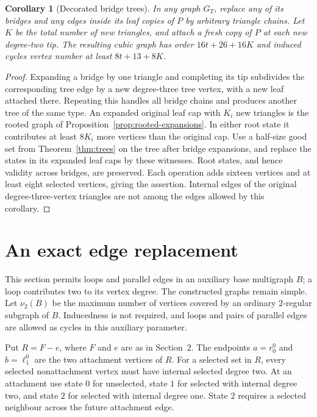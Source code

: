 \documentclass[11pt]{article}
\newtheorem{corollary}[theorem]{Corollary}
\begin{document}
\begin{corollary}[Decorated bridge trees]\label{cor:decorated-trees}
In any graph $G_T$, replace any of its bridges and any edges inside
its leaf copies of $P$ by arbitrary triangle chains. Let $K$ be the
total number of new triangles, and attach a fresh copy of $P$ at
each new degree-two tip. The resulting cubic graph has order
$16t+26+16K$ and induced cycles vertex number at least
$8t+13+8K$.
\end{corollary}
\begin{proof}
Expanding a bridge by one triangle and completing its tip subdivides
the corresponding tree edge by a new degree-three tree vertex,
with a new leaf attached there. Repeating this handles all bridge
chains and produces another tree of the same type. An expanded
original leaf cap with $K_i$ new triangles is the rooted graph of
Proposition~\ref{prop:rooted-expansions}. In either root state it
contributes at least $8K_i$ more vertices than the original cap.
Use a half-size good set from Theorem~\ref{thm:trees} on the tree
after bridge expansions, and replace the states in its expanded
leaf caps by these witnesses. Root states, and hence validity across
bridges, are preserved. Each operation adds sixteen vertices and
at least eight selected vertices, giving the assertion. Internal
edges of the original degree-three-vertex triangles are not among
the edges allowed by this corollary.
\end{proof}

\section{An exact edge replacement}
This section permits loops and parallel edges in an auxiliary base
multigraph $B$; a loop contributes two to its vertex degree. The
constructed graphs remain simple. Let $\nu_2(B)$ be the maximum
number of vertices covered by an ordinary $2$-regular subgraph of
$B$. Inducedness is not required, and loops and pairs of parallel
edges are allowed as cycles in this auxiliary parameter.

Put $R=F-e$, where $F$ and $e$ are as in Section~2. The endpoints
$a=r_0^0$ and $b=\ell_1^0$ are the two attachment vertices of $R$.
For a selected set in $R$, every selected nonattachment vertex must
have internal selected degree two. At an attachment use state $0$
for unselected, state $1$ for selected with internal degree two, and
state $2$ for selected with internal degree one. State $2$ requires
a selected neighbour across the future attachment edge.
\end{document}
